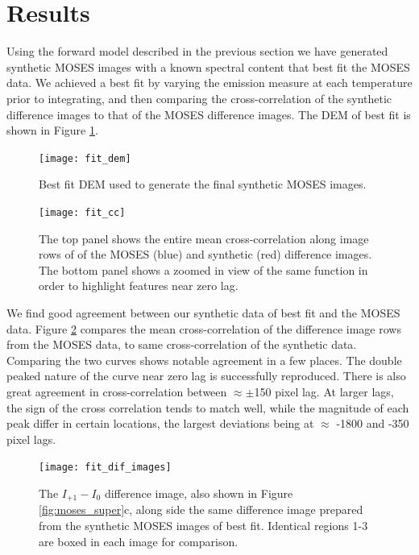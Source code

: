 	

\section{Results}\label{sec:results}
	Using the forward model described in the previous section we have generated synthetic MOSES images with a known spectral content that best fit the MOSES data.
	We achieved a best fit by varying the emission measure at each temperature prior to integrating, and then comparing the cross-correlation of the synthetic difference images to that of the MOSES difference images.
	The DEM of best fit is shown in Figure \ref{fig:dem}.
	
	\begin{figure}
		\centering
		\texttt{[image: fit\_dem]}
		\caption{Best fit DEM used to generate the final synthetic MOSES images.}
		\label{fig:dem}
	\end{figure}

	\begin{figure}
		\centering
		\texttt{[image: fit\_cc]}
		\caption{The top panel shows the entire mean cross-correlation along image rows of of the MOSES (blue) and synthetic (red) difference images.  The bottom panel shows a zoomed in view of the same function in order to highlight features near zero lag.}
		\label{fig:fit_cc}
	\end{figure}
	
	We find good agreement between our synthetic data of best fit and the MOSES data.
	Figure \ref{fig:fit_cc} compares the mean cross-correlation of the difference image rows from the MOSES data, to same cross-correlation of the synthetic data.
	Comparing the two curves shows notable agreement in a few places.
	The double peaked nature of the curve near zero lag is successfully reproduced.
	There is also great agreement in cross-correlation between $\approx\pm$150 pixel lag.
	At larger lags, the sign of the cross correlation tends to match well, while the magnitude of each peak differ in certain locations, the largest deviations being at $\approx$ -1800 and -350 pixel lags.
	
	\begin{figure}
		\centering
		\texttt{[image: fit\_dif\_images]}
		\caption{The $I_{+1}-I_0$ difference image, also shown in Figure \ref{fig:moses_super}c, along side the same difference image prepared from the synthetic MOSES images of best fit.  Identical regions 1-3 are boxed in each image for comparison. }
		\label{fig:dif_image_fit}
		
	\end{figure}
	
